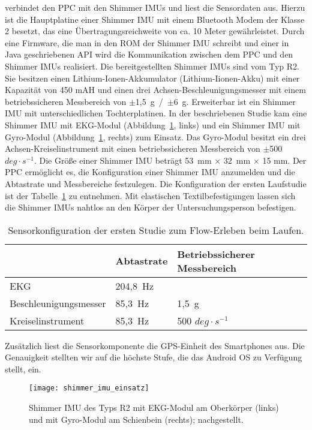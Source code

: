 \label{par:die_sensorkomponente}

verbindet den \ac{PPC} mit den Shimmer \acp{IMU} und liest die Sensordaten aus. Hierzu ist die Hauptplatine einer Shimmer \ac{IMU} mit einem Bluetooth Modem der Klasse 2 besetzt, das eine Übertragungsreichweite von ca. 10 Meter gewährleistet. Durch eine Firmware, die man in den \acs{ROM} der Shimmer \ac{IMU} schreibt und einer in Java geschriebenen \acs{API} wird die Kommunikation zwischen dem \ac{PPC} und den Shimmer \acp{IMU} realisiert. Die bereitgestellten Shimmer \acp{IMU} sind vom Typ R2. Sie besitzen einen Lithium-Ionen-Akkumulator (Lithium-Iionen-Akku) mit einer Kapazität von 450 mAH und einen drei Achsen-Beschleunigungsmesser mit einem betriebssicheren Messbereich von \mbox{$\pm$1,5~g / $\pm$6 g}. Erweiterbar ist ein Shimmer \ac{IMU} mit unterschiedlichen Tochterplatinen. In der beschriebenen Studie kam eine Shimmer \ac{IMU} mit EKG-Modul (Abbildung~\ref{fig:shimmer_imu_einsatz}, links) und ein Shimmer \ac{IMU} mit Gyro-Modul (Abbildung~\ref{fig:shimmer_imu_einsatz}, rechts) zum Einsatz. Das Gyro-Modul besitzt ein drei Achsen-Kreiselinstrument mit einen betriebssicheren Messbereich von \mbox{$\pm$500 $deg \cdot s^{-1}$}. Die Größe einer Shimmer \ac{IMU} beträgt 53~mm $\times$ 32~mm $\times$ 15 mm. Der \ac{PPC} ermöglicht es, die Konfiguration einer Shimmer \ac{IMU} anzumelden und die Abtastrate und Messbereiche festzulegen. Die Konfiguration der ersten Laufstudie ist der Tabelle~\ref{tab:sensorkonfiguration_1} zu entnehmen. Mit elastischen Textilbefestigungen lassen sich die Shimmer \acp{IMU} nahtlos an den Körper der Untersuchungsperson befestigen. 
\begin{table}
	[!htb] \caption[Sensorkonfiguration der ersten Studie zum Flow-Erleben beim Laufen.]{Sensorkonfiguration der ersten Studie zum Flow-Erleben beim Laufen.} \label{tab:sensorkonfiguration_1} 
	\begin{tabularx}
		{ 
		\textwidth}{p{} p{} p{}} \toprule & Abtastrate & Betriebssicherer Messbereich \\
		\midrule EKG & 204,8~Hz & \\
		Beschleunigungsmesser & 85,3~Hz & 1,5~g \\
		Kreiselinstrument & 85,3~Hz & 500 $deg \cdot s^{-1}$ \\
		\bottomrule 
	\end{tabularx}
\end{table}

Zusätzlich liest die Sensorkomponente die \ac{GPS}-Einheit des Smartphones aus. Die Genauigkeit stellten wir auf die höchste Stufe, die das Android OS zu Verfügung stellt, ein. 
\begin{figure}
	[!htb] \centering 
	\texttt{[image: shimmer\_imu\_einsatz]} \caption[Shimmer IMUs mit Modulen.]{Shimmer IMU des Typs R2 mit EKG-Modul am Oberkörper (links) und mit Gyro-Modul am Schienbein (rechts); nachgestellt.} \label{fig:shimmer_imu_einsatz} 
\end{figure}


